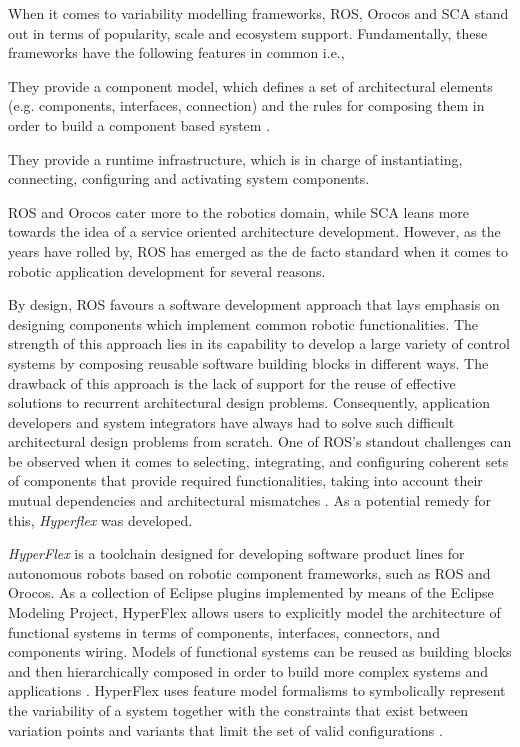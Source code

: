 \documentclass[conference]{IEEEtran}
\begin{document}
When it comes to variability modelling frameworks, ROS, Orocos and SCA stand out in terms of popularity, scale and ecosystem support. Fundamentally, these frameworks have the following features in common i.e., \begin{enumerate*}[label=(\roman*)]
	\item They provide a component model, which defines a set of architectural
elements (e.g. components, interfaces, connection) and the rules for
composing them in order to build a component based system \cite{lgherardi}.
	\item They provide a runtime infrastructure, which is in charge of instantiating, connecting, configuring and activating system components.
\end{enumerate*} 
ROS and Orocos cater more to the robotics domain, while SCA leans more towards the idea of a service oriented architecture development. However, as the years have rolled by, ROS has emerged as the de facto standard when it comes to robotic application development for several reasons.

By design, ROS favours a software development approach that lays emphasis on designing components which implement common robotic functionalities. The strength of this approach lies in its capability to develop a large variety of control systems by composing reusable software building blocks in different ways. The drawback of this approach is the lack of support for the
reuse of effective solutions to recurrent architectural design problems. Consequently, application developers and system integrators have always had to solve such difficult architectural design problems from scratch. One of ROS's standout challenges can be observed when it comes to selecting, integrating, and configuring coherent sets of components that provide required functionalities, taking into account their mutual dependencies and architectural mismatches \cite{ros-ref}. As a potential remedy for this, \textit{Hyperflex} was developed.

\textit{HyperFlex} is a toolchain designed for developing software product lines for autonomous robots based on robotic component frameworks, such as ROS and Orocos.
As a collection of Eclipse plugins implemented by means of the Eclipse Modeling Project, HyperFlex allows users to explicitly model the architecture of functional systems in terms of components, interfaces, connectors, and components wiring. Models of functional systems can be reused as building blocks and then hierarchically composed in order to build more complex systems and applications \cite{ros-ref}. HyperFlex uses feature model formalisms to symbolically represent the variability of a system together with the constraints that exist between variation points and variants that limit the set of valid configurations \cite{ros-ref}.
\end{document}
